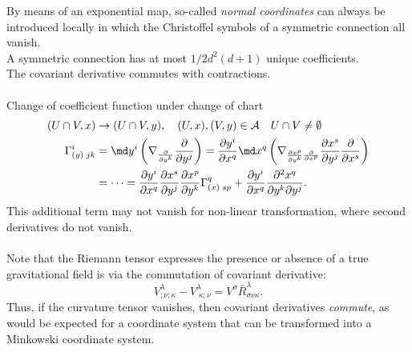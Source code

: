 By means of an exponential map, so-called \emph{normal coordinates} can always be introduced locally in which the Christoffel symbols of a symmetric connection all vanish.\\
A symmetric connection has at most $1/2 d^2 (d+1)$ unique coefficients.\\
The covariant derivative commutes with contractions.\\
\\
Change of coefficient function under change of chart
\begin{align*}
	(U \cap V,x) &\rightarrow (U\cap V,y), \quad (U,x), (V,y) \in \mathcal{A} \quad U\cap V \neq \emptyset \nonumber \\
	\Gamma^i_{(y) \; jk} &= \md y^i \left( \nabla_{\frac{\partial}{\partial y^k}} \frac{\partial}{\partial y^j}\right) = \frac{\partial y^i}{\partial x^q} \md x^q \left(\nabla_{\frac{\partial x^p}{\partial y^k}\frac{\partial}{\partial x^p}}  \frac{\partial x^s}{\partial y^j} \frac{\partial}{\partial x^s}\right) \nonumber \\
	&=\dots = \frac{\partial y^i}{\partial x^q}  \frac{\partial x^s}{\partial y^j} \frac{\partial x^p}{\partial y^k} \Gamma^q_{(x) \; sp}  + \frac{\partial y^i}{\partial x^q} \frac{\partial^2 x^q}{\partial y^k \partial y^j}. \nonumber
\end{align*}
This additional term may not vanish for non-linear transformation, where second derivatives do not vanish.
\\
\\
Note that the Riemann tensor expresses the presence or absence of a true gravitational field is via the commutation of covariant derivative:
\begin{equation}
V^\lambda_{;\nu;\kappa} - V^\lambda_{\;\kappa;\nu} = V^\sigma \bar{R}^\lambda_{\sigma \nu \kappa}.
\end{equation}
Thus, if the curvature tensor vanishes, then covariant derivatives \emph{commute}, as would be expected for a coordinate system that can be transformed into a Minkowski coordinate system.
















